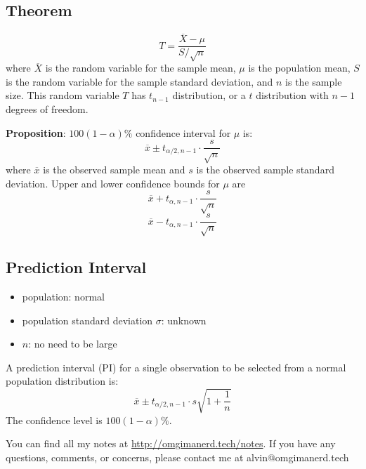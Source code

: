 \documentclass[letterpaper, 12pt]{math}
\begin{document}
\subsection*{Theorem}
\[ T = \frac{\overline{X}-\mu}{S/\sqrt{n}} \]
where \( \overline{X} \) is the random variable for the sample mean, \( \mu \)
is the population mean, \( S \) is the random variable for the sample standard
deviation, and \( n \) is the sample size. This random variable \( T \) has
\( t_{n-1} \) distribution, or a \( t \) distribution with \( n-1 \) degrees of
freedom. \par
\textbf{Proposition}: \( 100(1-\alpha)\% \) confidence interval for \( \mu \)
is:
\[ \overline{x}\pm t_{\alpha/2,n-1}\cdot\frac{s}{\sqrt{n}} \]
where \( \overline{x} \) is the observed sample mean and \( s \) is the observed
sample standard deviation. Upper and lower confidence bounds for \( \mu \) are
\[ \overline{x}+t_{\alpha,n-1}\cdot\frac{s}{\sqrt{n}} \]
\[ \overline{x}-t_{\alpha,n-1}\cdot\frac{s}{\sqrt{n}} \]

\subsection*{Prediction Interval}
\begin{itemize}
  \item population: normal
  \item population standard deviation \( \sigma \): unknown
  \item \( n \): no need to be large
\end{itemize}
A prediction interval (PI) for a single observation to be selected from a normal
population distribution is:
\[ \overline{x}\pm t_{\alpha/2,n-1}\cdot s\sqrt{1+\frac{1}{n}} \]
The confidence level is \( 100(1-\alpha)\% \).

\begin{center}
  You can find all my notes at \url{http://omgimanerd.tech/notes}. If you have
  any questions, comments, or concerns, please contact me at
  alvin@omgimanerd.tech
\end{center}
\end{document}
